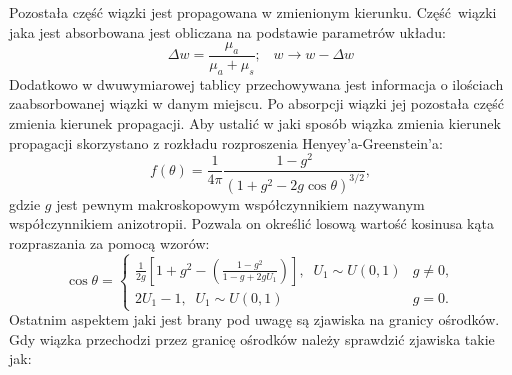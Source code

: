 \documentclass[a4paper, 12pt]{article}
\begin{document}
	Pozostała część wiązki jest propagowana w zmienionym kierunku.
	Część wiązki jaka jest absorbowana jest obliczana na podstawie parametrów układu:
	\[ 
		\Delta w = \frac{\mu_a}{\mu_a + \mu_s};
		 \; \; \; 
		 w \rightarrow w - \Delta w 	
	\] 
	Dodatkowo w dwuwymiarowej tablicy przechowywana jest informacja o ilościach zaabsorbowanej wiązki w danym miejscu.
	Po absorpcji wiązki jej pozostała część zmienia kierunek propagacji.
	Aby ustalić w jaki sposób wiązka zmienia kierunek propagacji skorzystano z rozkładu rozproszenia Henyey’a-Greenstein’a: 
	\[ f(\theta) =  \frac{1}{4\pi} \frac{1 - g^2}{(1+g^2 - 2g \cos\theta)^{3/2}}, \]
	gdzie $g$ jest pewnym makroskopowym współczynnikiem nazywanym współczynnikiem anizotropii. 
	Pozwala on określić losową wartość kosinusa kąta rozpraszania za pomocą wzorów:
	\begin{equation}
		\cos\theta = 
		\begin{cases}
			\frac{1}{2g}\left[1 + g^2 - \left(\frac{1-g^2}{1 - g + 2gU_1}\right)\right], \; \; U_1 \sim U(0,1) & g \neq 0, \\ 
			2U_1 - 1, \; \; U_1 \sim U(0,1) & g = 0.
		\end{cases}
	\end{equation}
	Ostatnim aspektem jaki jest brany pod uwagę są zjawiska na granicy ośrodków. 
	Gdy wiązka przechodzi przez granicę ośrodków należy sprawdzić zjawiska takie jak:
\end{document}
